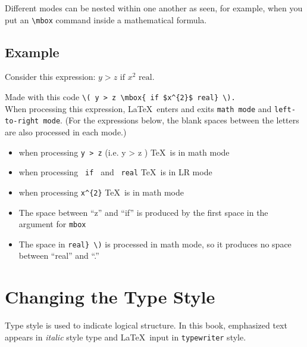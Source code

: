 \documentclass{article}
\begin{document}
Different modes can be nested within one another as seen, for example, when you put an 
\verb:\mbox: command inside a mathematical formula.

\subsection*{Example}\label{example}

Consider this expression: \( y > z \mbox{ if $x^{2}$ real} \).

\noindent Made with this code \verb:\( y > z \mbox{ if $x^{2}$ real} \).: \\

\noindent When processing this expression, \LaTeX\ enters and exits {\tt math mode} and
 {\tt left-to-right mode}. (For the expressions below, the blank spaces between the letters are
 also processed in each mode.) 
 
\begin{itemize}
   
   \item when processing \verb:y > z: (i.e. \textvisiblespace y \textvisiblespace > \textvisiblespace z \textvisiblespace) \TeX\ is in math mode
   
   \item when processing \verb: if : and \verb: real: \TeX\ is in LR mode
   
   \item when processing \verb:x^{2}: \TeX\ is in math mode
   
   \item The space between ``z'' and ``if'' is produced by the first space in the argument for
    {\tt mbox}

   \item The space in \verb:real} \): is processed in math mode, so it produces no space between
    ``real'' and ``.''
    
\end{itemize}


\section{Changing the Type Style}

Type style is used to indicate logical structure. In this book, emphasized text appears in 
\textit{italic} style type and \LaTeX\ input in \texttt{typewriter} style.
\end{document}
